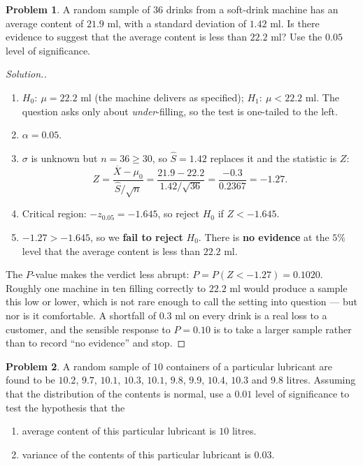 \documentclass[11pt,a4paper]{article}
\theoremstyle{definition}
\newtheorem{problemx}{Problem}[section]
\newenvironment{problem}{\begin{problemx}}{\end{problemx}}
\newenvironment{solution}
  {\renewcommand{\qedsymbol}{}\begin{proof}[\textit{Solution}.]}
  {\end{proof}}
\begin{document}
\begin{problem}
A random sample of $36$ drinks from a soft-drink machine has an average content of
$21.9$ ml, with a standard deviation of $1.42$ ml. Is there evidence to suggest that the
average content is less than $22.2$ ml? Use the $0.05$ level of significance.
\end{problem}

\begin{solution}
\begin{enumerate}
\item $H_0:\ \mu=22.2$ ml (the machine delivers as specified); $H_1:\ \mu<22.2$ ml. The
question asks only about \emph{under}-filling, so the test is one-tailed to the left.
\item $\alpha=0.05$.
\item $\sigma$ is unknown but $n=36\geq 30$, so $\hat{S}=1.42$ replaces it and the statistic
is $Z$:
\[Z=\frac{\overline{X}-\mu_0}{\hat{S}/\sqrt{n}}
=\frac{21.9-22.2}{1.42/\sqrt{36}}
=\frac{-0.3}{0.2367}=-1.27.\]
\item Critical region: $-z_{0.05}=-1.645$, so reject $H_0$ if $Z<-1.645$.
\item $-1.27>-1.645$, so we \textbf{fail to reject} $H_0$. There is \textbf{no evidence} at
the $5\%$ level that the average content is less than $22.2$ ml.
\end{enumerate}

The $P$-value makes the verdict less abrupt: $P=P(Z<-1.27)=0.1020$. Roughly one machine in
ten filling correctly to $22.2$ ml would produce a sample this low or lower, which is not
rare enough to call the setting into question --- but nor is it comfortable. A shortfall of
$0.3$ ml on every drink is a real loss to a customer, and the sensible response to
$P=0.10$ is to take a larger sample rather than to record ``no evidence'' and stop.
\end{solution}

\begin{problem}
A random sample of $10$ containers of a particular lubricant are found to be $10.2$, $9.7$,
$10.1$, $10.3$, $10.1$, $9.8$, $9.9$, $10.4$, $10.3$ and $9.8$ litres. Assuming that the
distribution of the contents is normal, use a $0.01$ level of significance to test the
hypothesis that the
\begin{enumerate}
\item[(a).] average content of this particular lubricant is $10$ litres.
\item[(b).] variance of the contents of this particular lubricant is $0.03$.
\end{enumerate}
\end{problem}
\end{document}
